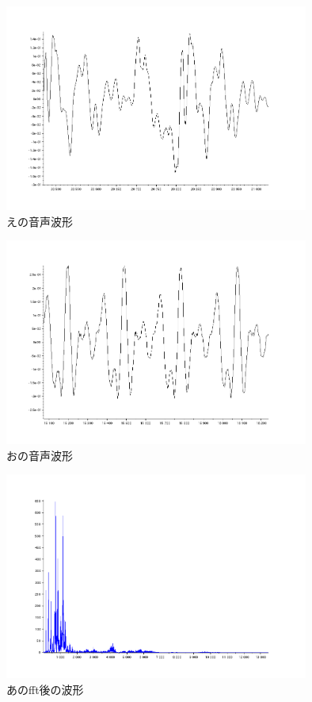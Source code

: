 \documentclass[12pt,oneside]{sotsuken_paper}
\begin{document}
\begin{figure}[htbp]
\begin{center}
\includegraphics[width=100mm]{img/e.png}
\caption{えの音声波形}
\label{fig:voice-e}
\end{center}
\end{figure}


\begin{figure}[htbp]
\begin{center}
\includegraphics[width=100mm]{img/o.png}
\caption{おの音声波形}
\label{fig:voice-o}
\end{center}
\end{figure}


\begin{figure}[htbp]
\begin{center}
\includegraphics[width=100mm]{img/a_fft.png}
\caption{あのfft後の波形}
\label{fig:a_fft}
\end{center}
\end{figure}
\end{document}
